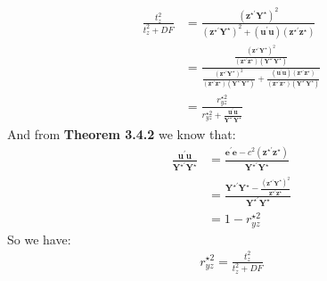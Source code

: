 \documentclass{article}
\begin{document}
	\begin{align*}
		\frac{t^2_z}{t^2_z + DF} &= \frac{(\boldsymbol{z}^{\star\prime} \boldsymbol{Y}^\star)^2}{(\boldsymbol{z}^{\star\prime} \boldsymbol{Y}^\star)^2+ (\boldsymbol{u}^\prime \boldsymbol{u}) (\boldsymbol{z}^{\star\prime} \boldsymbol{z}^\star)}\\
		&= \frac{\frac{(\boldsymbol{z}^{\star\prime} \boldsymbol{Y}^\star)^2}{(\boldsymbol{z}^{\star\prime} \boldsymbol{z}^\star) (\boldsymbol{Y}^{\star\prime} \boldsymbol{Y}^\star)}}{\frac{(\boldsymbol{z}^{\star\prime} \boldsymbol{Y}^\star)^2}{(\boldsymbol{z}^{\star\prime} \boldsymbol{z}^\star) (\boldsymbol{Y}^{\star\prime} \boldsymbol{Y}^\star)} + \frac{(\boldsymbol{u}^\prime \boldsymbol{u}) (\boldsymbol{z}^{\star\prime} \boldsymbol{z}^\star)}{(\boldsymbol{z}^{\star\prime} \boldsymbol{z}^\star) (\boldsymbol{Y}^{\star\prime} \boldsymbol{Y}^\star)}}\\
		&= \frac{r^{\star2}_{yz}}{r^{\star2}_{yz} + \frac{\boldsymbol{u}^\prime \boldsymbol{u}}{\boldsymbol{Y}^{\star\prime} \boldsymbol{Y}^{\star}}}
	\end{align*}
And from \textbf{Theorem 3.4.2} we know that:
	\begin{align*}
		\frac{\boldsymbol{u}^\prime \boldsymbol{u}}{\boldsymbol{Y}^{\star\prime} \boldsymbol{Y}^\star} &= \frac{\boldsymbol{e}^\prime \boldsymbol{e} - c^2 (\boldsymbol{z}^{\star\prime} \boldsymbol{z}^\star)}{\boldsymbol{Y}^{\star\prime} \boldsymbol{Y}^\star}\\
		&= \frac{\boldsymbol{Y}^{\star\prime} \boldsymbol{Y}^\star - \frac{(\boldsymbol{z}^{\star\prime} \boldsymbol{Y}^\star)^2}{\boldsymbol{z}^{\star\prime}\boldsymbol{z}^\star}}{\boldsymbol{Y}^{\star\prime} \boldsymbol{Y}^\star}\\
		&= 1 - r^{\star2}_{yz}
	\end{align*}
So we have:
	\begin{align*}
		r^{\star2}_{yz} = \frac{t^2_z}{t^2_z + DF}
	\end{align*}
\end{document}
